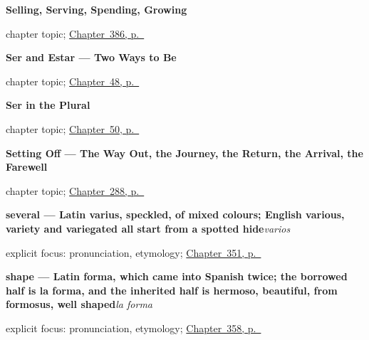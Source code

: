 \noindent\begin{minipage}[t]{\linewidth}
\raggedright
\textbf{Selling, Serving, Spending, Growing}\par
\footnotesize chapter topic; \hyperref[ch:vender-y-servir]{Chapter~386, p.~\pageref*{ch:vender-y-servir}}
\end{minipage}\par\smallskip

\noindent\begin{minipage}[t]{\linewidth}
\raggedright
\textbf{Ser and Estar --- Two Ways to Be}\par
\footnotesize chapter topic; \hyperref[ch:ser-y-estar]{Chapter~48, p.~\pageref*{ch:ser-y-estar}}
\end{minipage}\par\smallskip

\noindent\begin{minipage}[t]{\linewidth}
\raggedright
\textbf{Ser in the Plural}\par
\footnotesize chapter topic; \hyperref[ch:spanish-ser-plural]{Chapter~50, p.~\pageref*{ch:spanish-ser-plural}}
\end{minipage}\par\smallskip

\noindent\begin{minipage}[t]{\linewidth}
\raggedright
\textbf{Setting Off --- The Way Out, the Journey, the Return, the Arrival, the Farewell}\par
\footnotesize chapter topic; \hyperref[ch:la-partida]{Chapter~288, p.~\pageref*{ch:la-partida}}
\end{minipage}\par\smallskip

\noindent\begin{minipage}[t]{\linewidth}
\raggedright
\textbf{several — Latin varius, speckled, of mixed colours; English various, variety and variegated all start from a spotted hide}\enspace\emph{varios}\par
\footnotesize explicit focus: pronunciation, etymology; \hyperref[ch:cien-y-la-cantidad]{Chapter~351, p.~\pageref*{ch:cien-y-la-cantidad}}
\end{minipage}\par\smallskip

\noindent\begin{minipage}[t]{\linewidth}
\raggedright
\textbf{shape — Latin forma, which came into Spanish twice; the borrowed half is la forma, and the inherited half is hermoso, beautiful, from formosus, well shaped}\enspace\emph{la forma}\par
\footnotesize explicit focus: pronunciation, etymology; \hyperref[ch:el-color-y-el-tamano]{Chapter~358, p.~\pageref*{ch:el-color-y-el-tamano}}
\end{minipage}\par\smallskip

